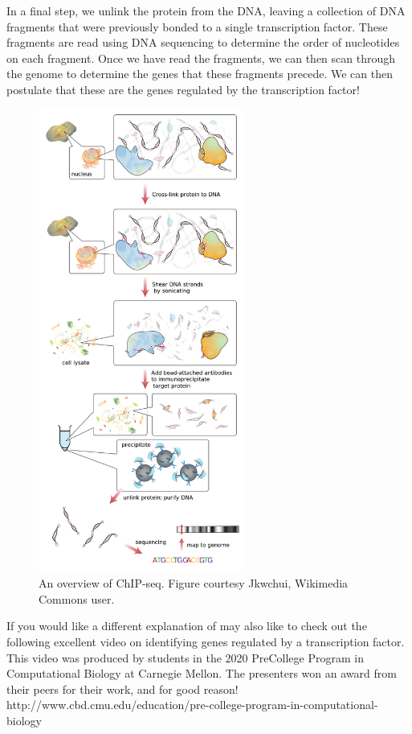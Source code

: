 In a final step, we unlink the protein from the DNA, leaving a collection of DNA fragments that were previously bonded to a single transcription factor. These fragments are read using DNA sequencing to determine the order of nucleotides on each fragment. Once we have read the fragments, we can then scan through the genome to determine the genes that these fragments precede. We can then postulate that these are the genes regulated by the transcription factor!

\begin{figure}[h]
\centering
\mySfFamily
\includegraphics[width = 0.6\textwidth]{../images/ChIP-seq_workflow.png}
\caption{An overview of ChIP-seq. Figure courtesy Jkwchui, Wikimedia Commons user.}
\label{fig:ChIP-seq_workflow}
\end{figure}

If you would like a different explanation of  may also like to check out the following excellent video on identifying genes regulated by a transcription factor. This video was produced by students in the 2020 PreCollege Program in Computational Biology at Carnegie Mellon. The presenters won an award from their peers for their work, and for good reason! http://www.cbd.cmu.edu/education/pre-college-program-in-computational-biology\\

